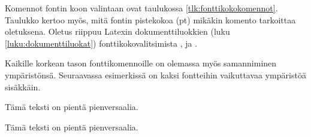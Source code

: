 Komennot fontin koon valintaan ovat taulukossa
\ref{tlk:fonttikokokomennot}. Taulukko kertoo myös, mitä fontin
pistekokoa (pt) mikäkin komento tarkoittaa oletuksena. Oletus riippuu
Latexin dokumenttiluokkien (luku \ref{luku:dokumenttiluokat})
fonttikokovalitsimista \koodi{10pt}, \koodi{11pt} ja \koodi{12pt}.



Kaikille korkean tason fonttikomennoille on olemassa myös samanniminen
ympäristönsä. Seuraavassa esimerkissä on kaksi fontteihin vaikuttavaa
ympäristöä sisäkkäin.


\begin{koodilohkosis}
  \begin{footnotesize}
    \begin{scshape}
      Tämä teksti on pientä pienversaalia.
    \end{scshape}
  \end{footnotesize}
\end{koodilohkosis}

\begin{tulossis}
  \begin{footnotesize}
    \begin{scshape}
      Tämä teksti on pientä pienversaalia.
    \end{scshape}
  \end{footnotesize}
\end{tulossis}

